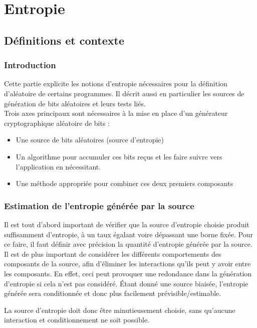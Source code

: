 \chapter{Entropie}
\section{Définitions et contexte}

\subsection{Introduction}
Cette partie explicite les notions d'entropie nécessaires pour la définition d'aléatoire de certains programmes. Il décrit aussi en particulier les sources de génération de bits aléatoires et leurs tests liés. \\



Trois axes principaux sont nécessaires à la mise en place d'un générateur cryptographique aléatoire de bits  : 
\begin{itemize}
\item Une source de bits aléatoires (source d'entropie)
\item Un algorithme pour accumuler ces bits reçus et les faire suivre vers l'application en nécessitant.
\item Une méthode appropriée pour combiner ces deux premiers composants\\
\end{itemize}


\subsection{Estimation de l'entropie générée par la source}
Il est tout d'abord important de vérifier que la source d'entropie choisie produit suffisamment d'entropie, à un taux égalant voire dépassant une borne fixée. Pour ce faire, il faut définir avec précision la quantité d'entropie générée par la source. Il est de plus important de considérer les différents comportements des composants de la source, afin d'éliminer les interactions qu'ils peut y avoir entre les composants. En effet, ceci peut provoquer une redondance dans la génération d'entropie si cela n'est pas considéré. Étant donné une source biaisée, l'entropie générée sera conditionnée et donc plus facilement prévisible/estimable.

La source d'entropie doit donc être minutieusement choisie, sans qu'aucune interaction et conditionnement ne soit possible.

